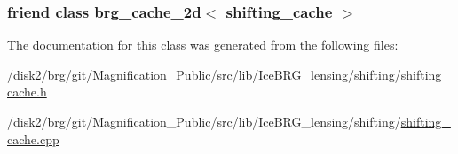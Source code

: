 \subsubsection[{brg\+\_\+cache\+\_\+2d$<$ shifting\+\_\+cache $>$}]{\setlength{\rightskip}{0pt plus 5cm}friend class {\bf brg\+\_\+cache\+\_\+2d}$<$ {\bf shifting\+\_\+cache} $>$\hspace{0.3cm}{\ttfamily [friend]}}\label{classIceBRG_1_1shifting__cache_a4753ec11cca5a88c552ffaa19a8e43cf}


The documentation for this class was generated from the following files\+:\begin{DoxyCompactItemize}
\item 
/disk2/brg/git/\+Magnification\+\_\+\+Public/src/lib/\+Ice\+B\+R\+G\+\_\+lensing/shifting/\hyperlink{shifting__cache_8h}{shifting\+\_\+cache.\+h}\item 
/disk2/brg/git/\+Magnification\+\_\+\+Public/src/lib/\+Ice\+B\+R\+G\+\_\+lensing/shifting/\hyperlink{shifting__cache_8cpp}{shifting\+\_\+cache.\+cpp}\end{DoxyCompactItemize}
